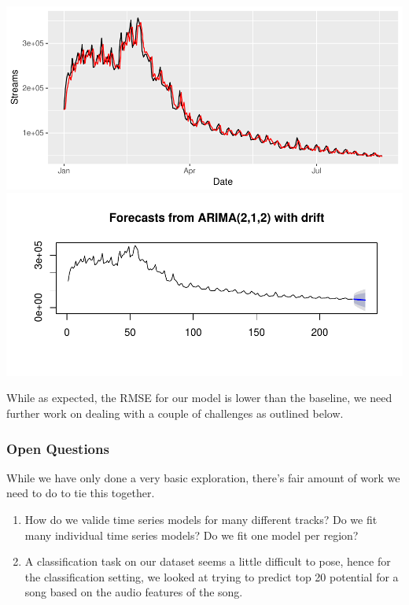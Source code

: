 \documentclass[]{article}
\begin{document}
\includegraphics{report-2_files/figure-latex/regress2-1.pdf}
\includegraphics{report-2_files/figure-latex/regress2-2.pdf}

While as expected, the RMSE for our model is lower than the baseline, we
need further work on dealing with a couple of challenges as outlined
below.

\subsubsection{Open Questions}\label{open-questions}

While we have only done a very basic exploration, there's fair amount of
work we need to do to tie this together.

\begin{enumerate}
\def\labelenumi{\arabic{enumi}.}
\item
  How do we valide time series models for many different tracks? Do we
  fit many individual time series models? Do we fit one model per
  region?
\item
  A classification task on our dataset seems a little difficult to pose,
  hence for the classification setting, we looked at trying to predict
  top 20 potential for a song based on the audio features of the song.
\end{enumerate}
\end{document}
